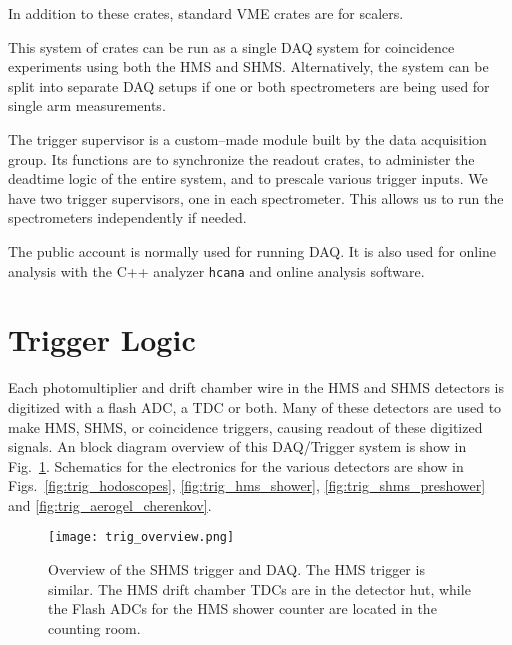 {In addition to these crates, standard VME crates are for scalers.

This system of crates can be run as a single DAQ system for
coincidence experiments using both the HMS and SHMS.  Alternatively,
the system can be split into separate DAQ setups if one or both
spectrometers are being used for single arm measurements.

\par
The trigger supervisor is a custom--made
module built by the data
acquisition group.  Its functions are to
synchronize the readout crates, to administer
the deadtime logic of the entire system, and
to prescale various trigger inputs.
We have two trigger supervisors,
one in each spectrometer.  This allows us to
run the spectrometers independently if needed.

\par
The public account  is normally
used for running DAQ.  It is also used for online
analysis with the C++ analyzer \texttt{hcana} and online analysis software.



\section{Trigger Logic}
Each photomultiplier and drift chamber wire in the HMS and SHMS detectors
is digitized with a flash ADC, a TDC or both.  Many of these detectors are
used to make HMS, SHMS, or coincidence triggers, causing readout of these
digitized signals.  An block diagram overview of this DAQ/Trigger system is
show in Fig.~\ref{fig:trig_overview}.  Schematics for the electronics for
the various detectors are show in Figs.~\ref{fig:trig_hodoscopes},
\ref{fig:trig_hms_shower}, \ref{fig:trig_shms_preshower} and
\ref{fig:trig_aerogel_cherenkov}.

\begin{figure}
\texttt{[image: trig\_overview.png]}
\caption{\label{fig:trig_overview}
Overview of the SHMS trigger and DAQ.  The HMS trigger is similar.
The HMS drift chamber TDCs are in the detector hut, while the Flash ADCs
for the HMS shower counter are located in the counting room.}
\end{figure}

}
